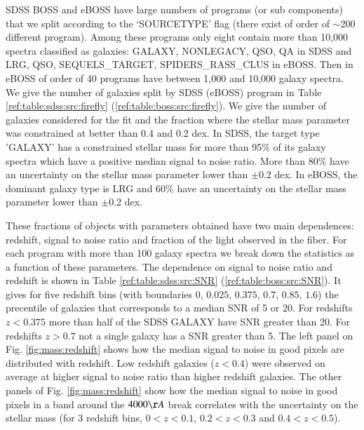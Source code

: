 \documentclass[onecolumn]{aa}
\begin{document}
SDSS  BOSS and eBOSS have large numbers of programs (or sub components) that we split according to the `SOURCETYPE' flag (there exist of order of $\sim$200 different program). 
Among these programs only eight contain more than 10,000 spectra classified as galaxies: GALAXY, NONLEGACY, QSO, QA in SDSS and LRG, QSO, SEQUELS\_TARGET, SPIDERS\_RASS\_CLUS in eBOSS. 
Then in eBOSS of order of 40 programs have between 1,000 and 10,000 galaxy spectra. 
We give the number of galaxies split by SDSS (eBOSS) program in Table 
\ref{ref:table:sdss:src:firefly}
(\ref{ref:table:boss:src:firefly}). 
We give the number of galaxies considered for the fit and the fraction where the stellar mass parameter was constrained at better than 0.4 and 0.2 dex. 
In SDSS, the target type 'GALAXY' has a constrained stellar mass for more than 95\% of its galaxy spectra which have a positive median signal to noise ratio. 
More than 80\% have an uncertainty on the stellar mass parameter lower than $\pm$0.2 dex. 
In eBOSS, the dominant galaxy type is LRG and 60\% have an uncertainty on the stellar mass parameter lower than $\pm$0.2 dex.  

These fractions of objects with parameters obtained have two main dependences: redshift, signal to noise ratio and fraction of the light observed in the fiber. For each program with more than 100 galaxy spectra we break down the statistics as a function of these parameters. 
The dependence on signal to noise ratio and redshift is shown in Table 
\ref{ref:table:sdss:src:SNR} 
(\ref{ref:table:boss:src:SNR}). 
It gives for five redshift bins (with boundaries $0$, $0.025$, $0.375$, $0.7$, $0.85$, $1.6$) the precentile of galaxies that corresponds to a median SNR of 5 or 20. 
For redshifts $z<0.375$ more than half of the SDSS GALAXY have SNR greater than 20. 
For redshifts $z>0.7$ not a single galaxy has a SNR greater than 5. 
The left panel on Fig. \ref{fig:mass:redshift} shows how the median signal to noise in good pixels are distributed with redshift. 
Low redshift galaxies ($z<0.4$) were observed on average at higher signal to noise ratio than higher redshift galaxies.
The other panels of Fig. \ref{fig:mass:redshift} show how the median signal to noise in good pixels in a band around the $4000\AA$ break correlates with the uncertainty on the stellar mass (for 3 redshift bins, $0<z<0.1$, $0.2<z<0.3$ and $0.4<z<0.5$).  
\end{document}
